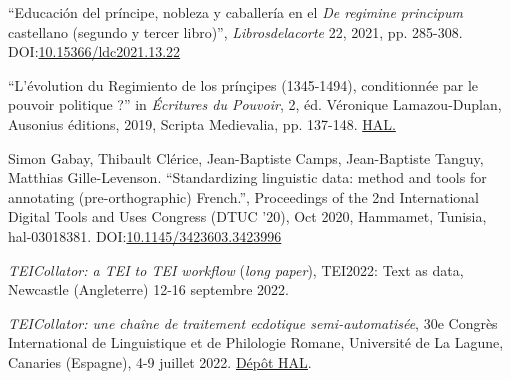 \begin{rubric}{}
                   
                
                    
                    \entry*
                
                        \enquote{Educación del príncipe, nobleza y caballería en el \textit{De regimine principum} castellano (segundo y tercer
                            libro)}, \textit{Librosdelacorte} 22, 2021, pp.
                        285-308. DOI:\href{https://doi.org/10.15366/ldc2021.13.22.010}{10.15366/ldc2021.13.22}
                    
                    
                    \entry*
                
                        \enquote{L'évolution du Regimiento de los prínçipes (1345-1494),
                            conditionnée par le pouvoir politique ?} in \textit{Écritures du Pouvoir}, 2, éd. Véronique Lamazou-Duplan, Ausonius
                        éditions, 2019, Scripta Medievalia, pp. 137-148. \href{https://hal.archives-ouvertes.fr/hal-02369116}{HAL.}
                    
                \vspace{1cm}
            
                    
                    \entry*
                Simon Gabay, Thibault Clérice, Jean-Baptiste Camps, Jean-Baptiste Tanguy,
                        Matthias Gille-Levenson. \enquote{Standardizing linguistic data: method and
                                tools for annotating (pre-orthographic) French.}, Proceedings
                        of the 2nd International Digital Tools and Uses Congress (DTUC '20), Oct 2020,
                        Hammamet, Tunisia, hal-03018381. DOI:\href{https://dx.doi.org/10.1145/3423603.3423996}{10.1145/3423603.3423996}
                \vspace{1cm}
            
                    
                    \entry*
                \textit{\textit{TEICollator: a TEI to TEI workflow}} (\textit{long
                            paper}), TEI2022: Text as data, Newcastle (Angleterre) 12-16 septembre
                        2022.
                    
                    \entry*
                \textit{TEICollator: une chaîne de traitement ecdotique
                            semi-automatisée}, 30e Congrès International de Linguistique et de
                        Philologie Romane, Université de La Lagune, Canaries (Espagne), 4-9 juillet 2022.
                            \href{https://hal.archives-ouvertes.fr/hal-03715059}{Dépôt
                        HAL}.
                    

\end{rubric}
